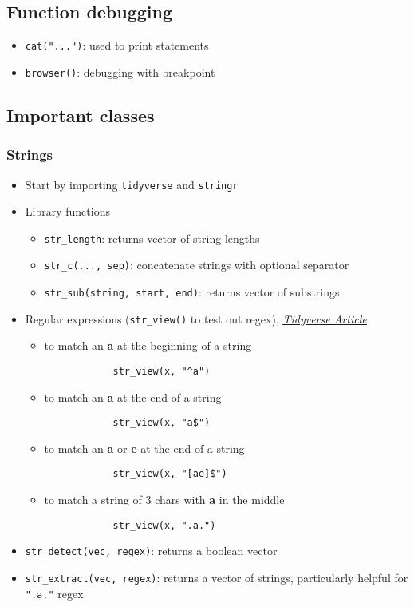 \documentclass{article}
\begin{document}
\begin{multicols}{2}
\subsection*{Function debugging}
\begin{itemize}
	\item \texttt{cat("...")}: used to print statements
	\item \texttt{browser()}: debugging with breakpoint
\end{itemize}
\subsection*{Important classes}
\subsubsection*{Strings}
\begin{itemize}
	\item Start by importing \texttt{tidyverse} and \texttt{stringr}
	\item Library functions
	\begin{itemize}
		\item \texttt{str\_length}: returns vector of string lengths
		\item \texttt{str\_c(..., sep)}: concatenate strings with optional separator
		\item \texttt{str\_sub(string, start, end)}: returns vector of substrings
	\end{itemize}
	\item Regular expressions (\texttt{str\_view()} to test out regex), \href{https://stringr.tidyverse.org/articles/regular-expressions.html}{\textit{\underline{Tidyverse Article}}}
	\begin{itemize}
		\item to match an \textbf{a} at the beginning of a string
		\begin{verbatim}
			str_view(x, "^a")
		\end{verbatim}
		\item to match an \textbf{a} at the end of a string
		\begin{verbatim}
			str_view(x, "a$")
		\end{verbatim}
		\item to match an \textbf{a} or \textbf{e} at the end of a string
		\begin{verbatim}
			str_view(x, "[ae]$")
		\end{verbatim}
		\item to match a string of 3 chars with \textbf{a} in the middle
		\begin{verbatim}
			str_view(x, ".a.")
		\end{verbatim}
	\end{itemize}
	\item \texttt{str\_detect(vec, regex)}: returns a boolean vector
	\item \texttt{str\_extract(vec, regex)}: returns a vector of strings, particularly helpful for \texttt{".a."} regex
\end{itemize}

\end{multicols}
\end{document}
